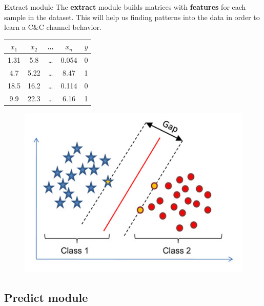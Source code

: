 \documentclass{beamer}
\begin{document}
	\begin{frame}{Extract module}
		The \textbf{extract} module builds matrices with \textbf{features} for each sample in the dataset. This will help us finding patterns into the data in order to learn a C\&C channel behavior.
		
		\begin{minipage}{.5\textwidth}
			\begin{longtable}[h]{c c c c | c}
				$x_1$ & $x_2$ & \dots & $x_n$ & $y$ \\ \hline \hline
				1.31 & 5.8 & \dots & 0.054 & 0 \\ \hline
				4.7 & 5.22 & \dots & 8.47 & 1 \\ \hline
				18.5 & 16.2 & \dots & 0.114 & 0 \\ \hline
				9.9 & 22.3 & \dots & 6.16 & 1 \\
			\end{longtable}
		\end{minipage}%
		\begin{minipage}{.5\textwidth}
			\begin{figure}
				\includegraphics[width=\textwidth]{svm.jpg}
			\end{figure}
		\end{minipage}
	\end{frame}
	
	\subsection{Predict module}
	
\end{document}
